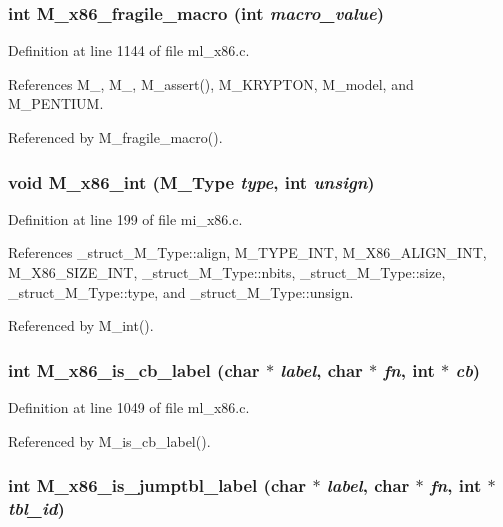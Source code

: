 \subsubsection{\setlength{\rightskip}{0pt plus 5cm}int M\_\-x86\_\-fragile\_\-macro (int {\em macro\_\-value})}\label{m__x86_8h_313d98d323e8127cb9628629177253a4}




Definition at line 1144 of file ml\_\-x86.c.

References M\_, M\_, M\_\-assert(), M\_\-KRYPTON, M\_\-model, and M\_\-PENTIUM.

Referenced by M\_\-fragile\_\-macro().
\subsubsection{\setlength{\rightskip}{0pt plus 5cm}void M\_\-x86\_\-int (\bf{M\_\-Type} {\em type}, int {\em unsign})}\label{m__x86_8h_c2b292c07dd32dbf28e017f72cd280f6}




Definition at line 199 of file mi\_\-x86.c.

References \_\-struct\_\-M\_\-Type::align, M\_\-TYPE\_\-INT, M\_\-X86\_\-ALIGN\_\-INT, M\_\-X86\_\-SIZE\_\-INT, \_\-struct\_\-M\_\-Type::nbits, \_\-struct\_\-M\_\-Type::size, \_\-struct\_\-M\_\-Type::type, and \_\-struct\_\-M\_\-Type::unsign.

Referenced by M\_\-int().
\subsubsection{\setlength{\rightskip}{0pt plus 5cm}int M\_\-x86\_\-is\_\-cb\_\-label (char $\ast$ {\em label}, char $\ast$ {\em fn}, int $\ast$ {\em cb})}\label{m__x86_8h_ec6c548016ac4f178bb5abeb4d0b1e1e}




Definition at line 1049 of file ml\_\-x86.c.

Referenced by M\_\-is\_\-cb\_\-label().
\subsubsection{\setlength{\rightskip}{0pt plus 5cm}int M\_\-x86\_\-is\_\-jumptbl\_\-label (char $\ast$ {\em label}, char $\ast$ {\em fn}, int $\ast$ {\em tbl\_\-id})}\label{m__x86_8h_3c8ee62d8ae26c67925595c7442f8109}




